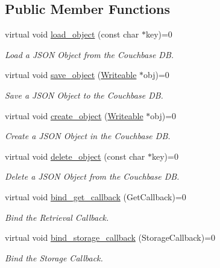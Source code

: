 \subsection*{Public Member Functions}
\begin{DoxyCompactItemize}
\item 
virtual void \hyperlink{classCouchbaseInterface_a62a765de48bfc92d748df829ca960ff2}{load\-\_\-object} (const char $\ast$key)=0
\begin{DoxyCompactList}\small\item\em Load a J\-S\-O\-N Object from the Couchbase D\-B. \end{DoxyCompactList}\item 
virtual void \hyperlink{classCouchbaseInterface_ab4ea907f469d14323e451ffdccb213c2}{save\-\_\-object} (\hyperlink{classWriteable}{Writeable} $\ast$obj)=0
\begin{DoxyCompactList}\small\item\em Save a J\-S\-O\-N Object to the Couchbase D\-B. \end{DoxyCompactList}\item 
virtual void \hyperlink{classCouchbaseInterface_a7ac9545e6f7a45d24e8e41ccae1f6112}{create\-\_\-object} (\hyperlink{classWriteable}{Writeable} $\ast$obj)=0
\begin{DoxyCompactList}\small\item\em Create a J\-S\-O\-N Object in the Couchbase D\-B. \end{DoxyCompactList}\item 
virtual void \hyperlink{classCouchbaseInterface_a99ec66952f649bb84c80b20487e82839}{delete\-\_\-object} (const char $\ast$key)=0
\begin{DoxyCompactList}\small\item\em Delete a J\-S\-O\-N Object from the Couchbase D\-B. \end{DoxyCompactList}\item 
virtual void \hyperlink{classCouchbaseInterface_aea02cefeae5b210318471696bd6580c9}{bind\-\_\-get\-\_\-callback} (Get\-Callback)=0
\begin{DoxyCompactList}\small\item\em Bind the Retrieval Callback. \end{DoxyCompactList}\item 
virtual void \hyperlink{classCouchbaseInterface_a229805a21e8dec6d5a4636644b420996}{bind\-\_\-storage\-\_\-callback} (Storage\-Callback)=0
\begin{DoxyCompactList}\small\item\em Bind the Storage Callback. \end{DoxyCompactList}\item 

\end{DoxyCompactItemize}
